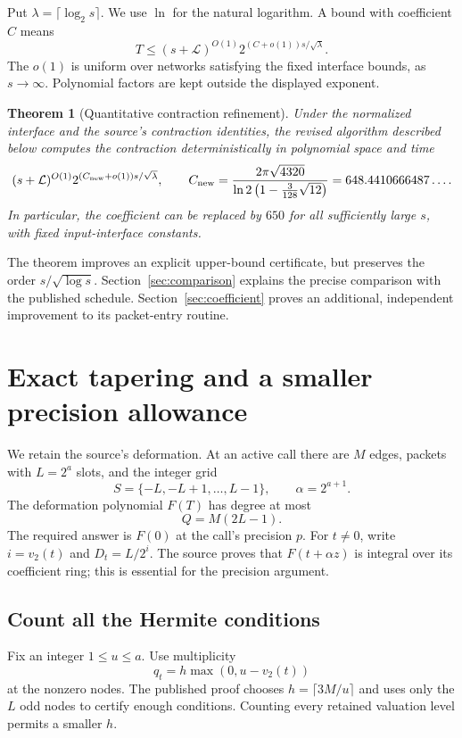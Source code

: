 \documentclass[11pt]{article}
\newtheorem{theorem}{Theorem}[section]
\theoremstyle{remark}
\newcommand{\vTwo}{v_2}
\newcommand{\LL}{\mathcal L}
\begin{document}
Put $\lambda=\lceil\log_2s\rceil$. We use $\ln$ for the natural logarithm. A bound with coefficient $C$ means
\[
 T\le (s+\LL)^{O(1)}
   2^{(C+o(1))s/\sqrt\lambda}.
\]
The $o(1)$ is uniform over networks satisfying the fixed interface bounds, as $s\to\infty$. Polynomial factors are kept outside the displayed exponent.

\begin{theorem}[Quantitative contraction refinement]
\label{thm:main}
Under the normalized interface and the source's contraction identities, the revised algorithm described below computes the contraction deterministically in polynomial space and time
\[
 (s+\LL)^{O(1)}
  2^{(C_{\rm new}+o(1))s/\sqrt\lambda},
 \qquad
 C_{\rm new}=
 \frac{2\pi\sqrt{4320}}
 {\ln2\left(1-\frac3{128}\sqrt{12}\right)}
 =648.4410666487\ldots .
\]
In particular, the coefficient can be replaced by $650$ for all sufficiently large $s$, with fixed input-interface constants.
\end{theorem}

The theorem improves an explicit upper-bound certificate, but preserves the order $s/\sqrt{\log s}$. Section~\ref{sec:comparison} explains the precise comparison with the published schedule. Section~\ref{sec:coefficient} proves an additional, independent improvement to its packet-entry routine.

\section{Exact tapering and a smaller precision allowance}
\label{sec:taper}

We retain the source's deformation. At an active call there are $M$ edges, packets with $L=2^a$ slots, and the integer grid
\[
 S=\{-L,-L+1,\ldots,L-1\},\qquad \alpha=2^{a+1}.
\]
The deformation polynomial $F(T)$ has degree at most
\begin{equation}
 Q=M(2L-1).\label{eq:degree}
\end{equation}
The required answer is $F(0)$ at the call's precision $p$. For $t\ne0$, write $i=\vTwo(t)$ and $D_t=L/2^i$. The source proves that $F(t+\alpha z)$ is integral over its coefficient ring; this is essential for the precision argument.

\subsection{Count all the Hermite conditions}

Fix an integer $1\le u\le a$. Use multiplicity
\[
 q_t=h\max(0,u-\vTwo(t))
\]
at the nonzero nodes. The published proof chooses $h=\lceil3M/u\rceil$ and uses only the $L$ odd nodes to certify enough conditions. Counting every retained valuation level permits a smaller $h$.
\end{document}
